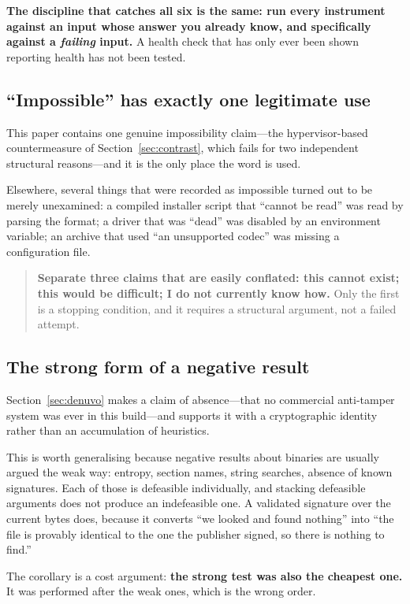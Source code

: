 \textbf{The discipline that catches all six is the same: run every instrument
against an input whose answer you already know, and specifically against a
\emph{failing} input.} A health check that has only ever been shown reporting
health has not been tested.

\subsection{``Impossible'' has exactly one legitimate use}

This paper contains one genuine impossibility claim---the hypervisor-based
countermeasure of Section~\ref{sec:contrast}, which fails for two independent
structural reasons---and it is the only place the word is used.

Elsewhere, several things that were recorded as impossible turned out to be
merely unexamined: a compiled installer script that ``cannot be read'' was read
by parsing the format; a driver that was ``dead'' was disabled by an environment
variable; an archive that used ``an unsupported codec'' was missing a
configuration file.

\begin{quote}
\textbf{Separate three claims that are easily conflated: this cannot exist; this
would be difficult; I do not currently know how.} Only the first is a stopping
condition, and it requires a structural argument, not a failed attempt.
\end{quote}

\subsection{The strong form of a negative result}

Section~\ref{sec:denuvo} makes a claim of absence---that no commercial anti-tamper
system was ever in this build---and supports it with a cryptographic identity
rather than an accumulation of heuristics.

This is worth generalising because negative results about binaries are usually
argued the weak way: entropy, section names, string searches, absence of known
signatures. Each of those is defeasible individually, and stacking defeasible
arguments does not produce an indefeasible one. A validated signature over the
current bytes does, because it converts ``we looked and found nothing'' into
``the file is provably identical to the one the publisher signed, so there is
nothing to find.''

The corollary is a cost argument: \textbf{the strong test was also the cheapest
one.} It was performed after the weak ones, which is the wrong order.

